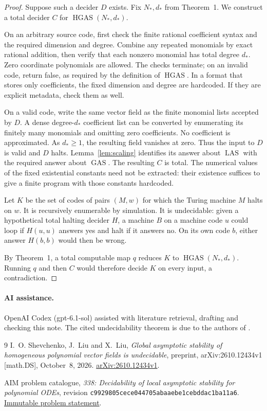 \documentclass[11pt]{article}
\newcommand{\LAS}{\operatorname{LAS}}
\newcommand{\GAS}{\operatorname{GAS}}
\newcommand{\HGAS}{\operatorname{HGAS}}
\begin{document}
\begin{proof}
Suppose such a decider $D$ exists. Fix $N_*,d_*$ from Theorem~1. We construct
a total decider $C$ for $\HGAS(N_*,d_*)$.

On an arbitrary source code, first check the finite rational coefficient
syntax and the required dimension and degree. Combine any repeated monomials
by exact rational addition, then verify that each nonzero monomial has total
degree $d_*$. Zero coordinate polynomials are allowed. The checks terminate;
on an invalid code, return false, as required by the definition of $\HGAS$.
In a format that stores only coefficients, the fixed dimension and degree
are hardcoded. If they are explicit metadata, check them as well.

On a valid code, write the same vector field as the finite monomial lists
accepted by $D$. A dense degree-$d_*$ coefficient list can be converted by
enumerating its finitely many monomials and omitting zero coefficients. No
coefficient is approximated. As $d_*\geq1$, the resulting field vanishes at
zero. Thus the input to $D$ is valid and $D$ halts. Lemma~\ref{lem:scaling}
identifies its answer about $\LAS$ with the required answer about $\GAS$.
The resulting $C$ is total. The numerical values of the fixed existential
constants need not be extracted: their existence suffices to give a finite
program with those constants hardcoded.

Let $K$ be the set of codes of pairs $(M,w)$ for which the Turing machine $M$
halts on $w$. It is recursively enumerable by simulation. It is undecidable:
given a hypothetical total halting decider $H$, a machine $B$ on a machine
code $u$ could loop if $H(u,u)$ answers yes and halt if it answers no. On its
own code $b$, either answer $H(b,b)$ would then be wrong.

By Theorem~1, a total computable map $q$ reduces $K$ to
$\HGAS(N_*,d_*)$. Running $q$ and then $C$ would therefore decide $K$ on
every input, a contradiction.
\end{proof}

\paragraph{AI assistance.}
OpenAI Codex (gpt-6.1-sol) assisted with literature retrieval, drafting and
checking this note. The cited undecidability theorem is due to the authors
of \cite{SLL}.

\begin{thebibliography}{9}
I.~O. Shevchenko, J.~Liu and X.~Liu,
\emph{Global asymptotic stability of homogeneous polynomial vector fields is
undecidable}, preprint, arXiv:2610.12434v1 [math.DS], October~8, 2026.
\href{https://arxiv.org/abs/2610.12434v1}{arXiv:2610.12434v1}.

AIM problem catalogue,
\emph{338: Decidability of local asymptotic stability for polynomial ODEs},
revision \texttt{c9929805cece044705abaaebe1cebddac1ba11a6}.
\href{https://github.com/MColbrook/AIM/blob/c9929805cece044705abaaebe1cebddac1ba11a6/problems/338-polynomial-local-stability-decidability.md}{Immutable problem statement}.
\end{thebibliography}
\end{document}
